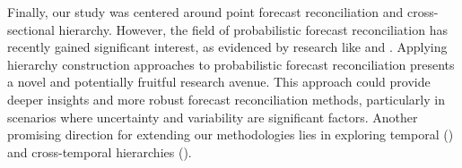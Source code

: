 \documentclass[a4paper,review,12pt,authoryear]{elsarticle}
\begin{document}
Finally, our study was centered around point forecast reconciliation and cross-sectional hierarchy. However, the field of probabilistic forecast reconciliation has recently gained significant interest, as evidenced by research like \cite{panagiotelisProbabilisticForecastReconciliation2023} and \cite{jeonProbabilisticForecastReconciliation2019}. Applying hierarchy construction approaches to probabilistic forecast reconciliation presents a novel and potentially fruitful research avenue. This approach could provide deeper insights and more robust forecast reconciliation methods, particularly in scenarios where uncertainty and variability are significant factors.
Another promising direction for extending our methodologies lies in exploring temporal (\citealp{athanasopoulosForecastingTemporalHierarchies2017}) and cross-temporal hierarchies (\citealp{girolimettoCrosstemporalProbabilisticForecast2023a}). 


\clearpage 
\newpage 





\begingroup
{}


\endgroup
\end{document}
